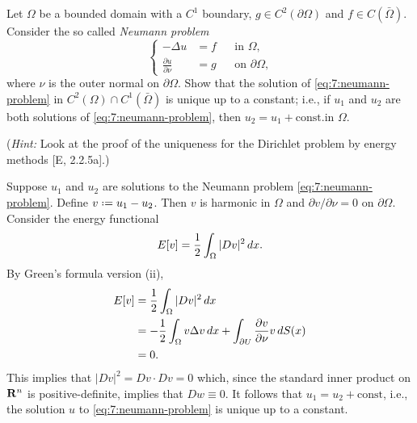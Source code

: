 \begin{problem}
  Let \(\Omega\) be a bounded domain with a \(C^1\) boundary, \(g\in
  C^2(\partial\Omega)\) and \(f\in C(\bar\Omega)\). Consider the so called
  \emph{Neumann problem}
  \[
    \label{eq:7:neumann-problem}%
    \tag{\(*\)}%
    \left\{
      \begin{aligned}
        -\Delta u&=f&&\text{in \(\Omega\),}\\
        \frac{\partial u}{\partial\nu}&=g&&\text{on \(\partial\Omega\),}
      \end{aligned}
    \right.
  \]
  where \(\nu\) is the outer normal on \(\partial\Omega\). Show that the
  solution of \eqref{eq:7:neumann-problem} in
  \(C^2(\Omega)\cap C^1(\bar\Omega)\) is unique up to a constant; i.e., if
  \(u_1\) and \(u_2\) are both solutions of \eqref{eq:7:neumann-problem},
  then \(u_2=u_1+\text{const.}\)\@ in \(\Omega\).

  \noindent (\emph{Hint:} Look at the proof of the uniqueness for the
  Dirichlet problem by energy methods [E, 2.2.5a].)
\end{problem}
\begin{solution*}
  Suppose \(u_1\) and \(u_2\) are solutions to the Neumann problem
  \eqref{eq:7:neumann-problem}. Define \(v\defeq u_1-u_2\). Then \(v\) is
  harmonic in \(\Omega\) and \(\partial v/\partial \nu=0\) on
  \(\partial\Omega\). Consider the energy functional
  \[
    E[v]=\frac{1}{2}\int_\Omega|Dv|^2\mathop{}\!d x.
  \]
  By Green's formula version (ii),
  \begin{align*}
    E[v]
    &=\frac{1}{2}\int_\Omega|Dv|^2\mathop{}\!d x\\
    &=-\frac{1}{2}\int_\Omega v\Delta v\mathop{}\!d x
      +\int_{\partial U}\frac{\partial
      v}{\partial\nu} v\mathop{}\!d S(x)\\
    &=0.
  \end{align*}
  This implies that \(|Dv|^2=Dv\cdot Dv=0\) which, since the standard inner
  product on \(\mathbf{R}^n\) is positive-definite, implies that \(Dw\equiv
  0\). It follows that \(u_1=u_2+\text{const}\), i.e., the solution \(u\)
  to \eqref{eq:7:neumann-problem} is unique up to a constant.
\end{solution*}


